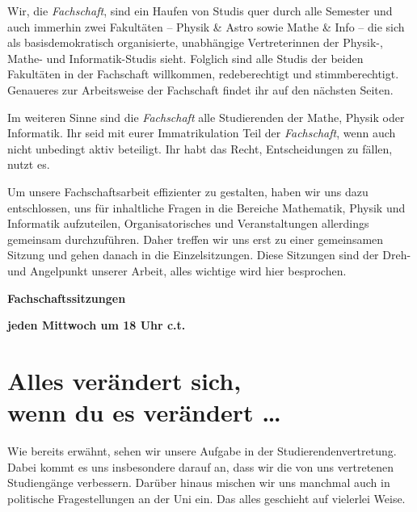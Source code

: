 Wir, die \emph{Fachschaft}, sind ein Haufen von Studis quer durch alle Semester und auch immerhin zwei Fakultäten -- Physik \& Astro sowie Mathe \& Info -- die sich als basisdemokratisch organisierte, unabhängige Vertreterinnen der Physik-, Mathe- und Informatik-Studis sieht. Folglich sind alle Studis der beiden Fakultäten in der Fachschaft willkommen, redeberechtigt und stimmberechtigt. Genaueres zur Arbeitsweise der Fachschaft findet ihr auf den nächsten Seiten.

Im weiteren Sinne sind die \emph{Fachschaft} alle Studierenden der Mathe, Physik oder Informatik. Ihr seid mit eurer Immatrikulation Teil der \emph{Fachschaft}, wenn auch nicht unbedingt aktiv beteiligt. Ihr habt das Recht, Entscheidungen zu fällen, nutzt es.

Um unsere Fachschaftsarbeit effizienter zu gestalten, haben wir uns dazu entschlossen, uns für inhaltliche Fragen in die Bereiche Mathematik, Physik und Informatik aufzuteilen, Organisatorisches und Veranstaltungen allerdings gemeinsam durchzuführen. Daher treffen wir uns erst zu einer gemeinsamen Sitzung und gehen danach in die Einzelsitzungen. Diese Sitzungen sind der Dreh- und Angelpunkt unserer Arbeit, alles wichtige wird hier besprochen.

\begin{center}
    \large \textbf{Fachschaftssitzungen}

    \textbf{jeden Mittwoch um 18 Uhr \gls{c.t.}}

\end{center}
\begin{figure}[b]

\end{figure}

\section[Alles verändert sich, wenn du es veränderst \dots]{Alles verändert sich, \\wenn du es verändert \dots}
Wie bereits erwähnt, sehen wir unsere Aufgabe in der Studierendenvertretung. Dabei kommt es uns insbesondere darauf an, dass wir die von uns vertretenen Studiengänge verbessern. Darüber hinaus mischen wir uns manchmal auch in politische Fragestellungen an der Uni ein. Das alles geschieht auf vielerlei Weise.

